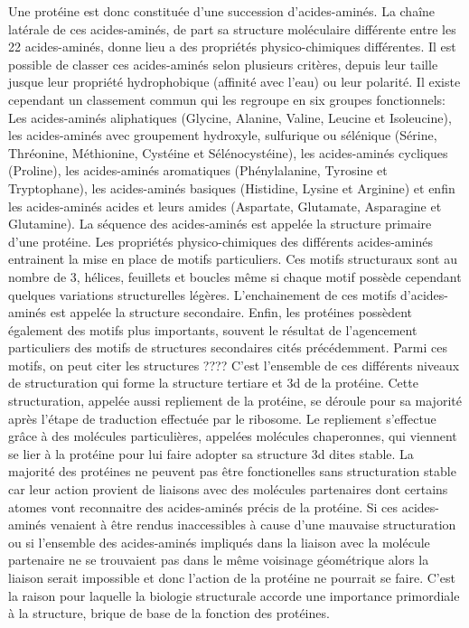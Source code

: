 Une protéine est donc constituée d'une succession d'acides-aminés. La chaîne latérale de ces acides-aminés, de part sa structure moléculaire différente entre les 22 acides-aminés, donne lieu a des propriétés physico-chimiques différentes. Il est possible de classer ces acides-aminés selon plusieurs critères, depuis leur taille jusque leur propriété hydrophobique (affinité avec l'eau) ou leur polarité. Il existe cependant un classement commun qui les regroupe en six groupes fonctionnels: Les acides-aminés aliphatiques (Glycine, Alanine, Valine, Leucine et Isoleucine), les acides-aminés avec groupement hydroxyle, sulfurique ou sélénique (Sérine, Thréonine, Méthionine, Cystéine et Sélénocystéine), les acides-aminés cycliques (Proline), les acides-aminés aromatiques (Phénylalanine, Tyrosine et Tryptophane), les acides-aminés basiques (Histidine, Lysine et Arginine) et enfin les acides-aminés acides et leurs amides (Aspartate, Glutamate, Asparagine et Glutamine).
La séquence des acides-aminés est appelée la structure primaire d'une protéine. Les propriétés physico-chimiques des différents acides-aminés entrainent la mise en place de motifs particuliers. Ces motifs structuraux sont au nombre de 3, hélices, feuillets et boucles même si chaque motif possède cependant quelques variations structurelles légères. L'enchainement de ces motifs d'acides-aminés est appelée la structure secondaire. 
Enfin, les protéines possèdent également des motifs plus importants, souvent le résultat de l'agencement particuliers des motifs de structures secondaires cités précédemment. Parmi ces motifs, on peut citer les structures ????
C'est l'ensemble de ces différents niveaux de structuration qui forme la structure tertiare et 3d de la protéine.
Cette structuration, appelée aussi repliement de la protéine, se déroule pour sa majorité après l'étape de traduction effectuée par le ribosome. Le repliement s'effectue grâce à des molécules particulières, appelées molécules chaperonnes, qui viennent se lier à la protéine pour lui faire adopter sa structure 3d dites stable. La majorité des protéines ne peuvent pas être fonctionelles sans structuration stable car leur action provient de liaisons avec des molécules partenaires dont certains atomes vont reconnaitre des acides-aminés précis de la protéine. Si ces acides-aminés venaient à être rendus inaccessibles à cause d'une mauvaise structuration ou si l'ensemble des acides-aminés impliqués dans la liaison avec la molécule partenaire ne se trouvaient pas dans le même voisinage géométrique alors la liaison serait impossible et donc l'action de la protéine ne pourrait se faire. C'est la raison pour laquelle la biologie structurale accorde une importance primordiale à la structure, brique de base de la fonction des protéines.


